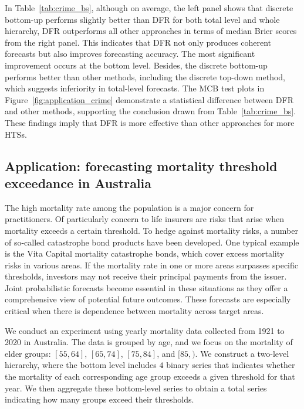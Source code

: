 \documentclass[a4paper,review,12pt,authoryear]{elsarticle}
\theoremstyle{definition}
\begin{document}
     In Table~\ref{tab:crime_bs},  although on average, the left panel shows that discrete bottom-up performs slightly better than DFR for both total level and whole hierarchy, DFR outperforms all other approaches in terms of median Brier scores from the right panel. This indicates that DFR not only produces coherent forecasts but also improves forecasting accuracy. The most significant improvement occurs at the bottom level. Besides, the discrete bottom-up performs better than other methods, including the discrete top-down method, which suggests inferiority in total-level forecasts. The MCB test plots in Figure~\ref{fig:application_crime} demonstrate a statistical difference between DFR and other methods, supporting the conclusion drawn from Table~\ref{tab:crime_bs}. These findings imply that DFR is more effective than other approaches for more HTSs.

     \subsection{Application: forecasting mortality threshold exceedance in Australia}
     \label{sec:application_mortality}
     The high mortality rate among the population is a major concern for practitioners.
     Of particularly concern to life insurers are risks that arise when mortality exceeds a certain threshold. To hedge against mortality risks, a number of so-called catastrophe bond products have been developed.
     One typical example is the Vita Capital mortality catastrophe bonds, which cover excess mortality risks in various areas.
     If the mortality rate in one or more areas surpasses specific thresholds, investors may not receive their principal payments from the issuer.
     Joint probabilistic forecasts become essential in these situations as they offer a comprehensive view of potential future outcomes.
     These forecasts are especially critical when there is dependence between mortality across target areas.

     We conduct an experiment using yearly mortality data collected from 1921 to 2020 in Australia.
     The data is grouped by age, and we focus on the mortality of elder groups: $[55, 64]$, $[65, 74]$, $[75, 84]$, and $[85, )$.
     We construct a two-level hierarchy, where the bottom level includes
     $4$ binary series that indicates whether the mortality of each corresponding age group exceeds a given threshold for that year.
     We then aggregate these bottom-level series to obtain a total series indicating how many groups exceed their thresholds.
\end{document}

